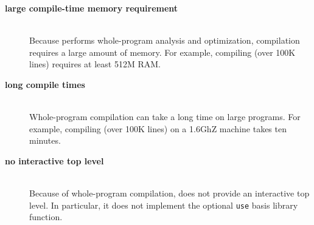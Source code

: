 
\newcommand{\drawback}[1]{\item[\bf #1]\hspace{1in}\\}

\begin{description}

\drawback{large compile-time memory requirement}
Because {\mlton} performs whole-program analysis and optimization,
compilation requires a large amount of memory.  For example, compiling
{\mlton} (over 100K lines) requires at least 512M RAM.

\drawback{long compile times}
Whole-program compilation can take a long time on large programs.  For
example, compiling {\mlton} (over 100K lines) on a 1.6GhZ machine
takes ten minutes.

\drawback{no interactive top level}
Because of whole-program compilation, {\mlton} does not provide an
interactive top level.  In particular, it does not implement the
optional {\tt use} basis library function.

\end{description}
